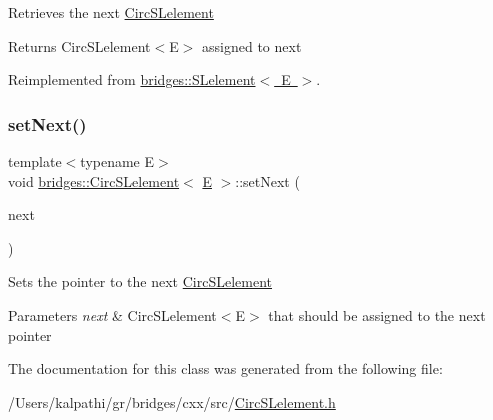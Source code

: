 Retrieves the next \mbox{\hyperlink{classbridges_1_1_circ_s_lelement}{Circ\+S\+Lelement}} \begin{DoxyReturn}{Returns}
Circ\+S\+Lelement$<$\+E$>$ assigned to next 
\end{DoxyReturn}


Reimplemented from \mbox{\hyperlink{classbridges_1_1_s_lelement_a5bd74108a9aa49339378bf62cdbb19ca}{bridges\+::\+S\+Lelement$<$ E $>$}}.

\mbox{\label{classbridges_1_1_circ_s_lelement_a7b2512dd1cc559f0a89d9ab4aafed172}} 
\subsubsection{\texorpdfstring{setNext()}{setNext()}}
{\footnotesize\ttfamily template$<$typename E$>$ \\
void \mbox{\hyperlink{classbridges_1_1_circ_s_lelement}{bridges\+::\+Circ\+S\+Lelement}}$<$ \mbox{\hyperlink{namespacebridges_acfb0a4f7877d8f63de3e6862004c50eda3a3ea00cfc35332cedf6e5e9a32e94da}{E}} $>$\+::set\+Next (\begin{DoxyParamCaption}\item[{\mbox{\hyperlink{classbridges_1_1_circ_s_lelement}{Circ\+S\+Lelement}}$<$ \mbox{\hyperlink{namespacebridges_acfb0a4f7877d8f63de3e6862004c50eda3a3ea00cfc35332cedf6e5e9a32e94da}{E}} $>$ $\ast$}]{next }\end{DoxyParamCaption})\hspace{0.3cm}{\ttfamily [inline]}}

Sets the pointer to the next \mbox{\hyperlink{classbridges_1_1_circ_s_lelement}{Circ\+S\+Lelement}} 
\begin{DoxyParams}{Parameters}
{\em next} & Circ\+S\+Lelement$<$\+E$>$ that should be assigned to the next pointer \\
\hline
\end{DoxyParams}


The documentation for this class was generated from the following file\+:\begin{DoxyCompactItemize}
\item 
/\+Users/kalpathi/gr/bridges/cxx/src/\mbox{\hyperlink{_circ_s_lelement_8h}{Circ\+S\+Lelement.\+h}}\end{DoxyCompactItemize}
